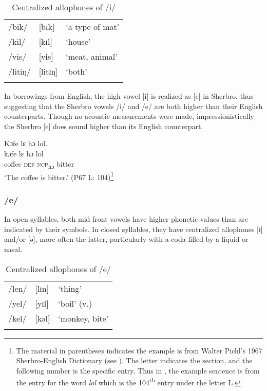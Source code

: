 \begin{table}
\caption{\label{tab:phon:6}Centralized allophones of /i/}

\begin{tabular}{lll}
\lsptoprule
/bik/ & [bɪk] & ‘a type of mat'\\
/kil/ & [kɪl] & ‘house'\\
/vis/ & [vɨs] & ‘meat, animal'\\
/litiŋ/ & [litɪŋ] & ‘both'\\
\lspbottomrule
\end{tabular}
\end{table}

In borrowings from English, the high vowel [i] is realized as [e] in Sherbro, thus suggesting that the Sherbro vowels /i/ and /e/ are both higher than their English counterparts. Though no acoustic measurements were made, impressionistically the Sherbro [e] does sound higher than its English counterpart.

\ea %
\label{ex:14}
Kɔfe lɛ hɔ lol.\\
\gll kɔfe    lɛ    hɔ    lol\\
coffee  \textsc{def}  \textsc{ncp}\textsubscript{hɔ}  bitter\\
\glt ‘The coffee is bitter.' (P67 L: 104)\footnote{The material in parentheses indicates the example is from Walter Pichl's 1967 Sherbro-English Dictionary (see ). The letter indicates the section, and the following number is the specific entry. Thus in , the example sentence is from the entry for the word \textit{lol} which is the 104\textsuperscript{th} entry under the letter L.}
\z

\subsubsection{/e/}
\label{sec:2.1.1.2}
In open syllables, both mid front vowels have higher phonetic values than are indicated by their symbols. In closed syllables, they have centralized allophones [ɪ] and/or [ə], more often the latter, particularly with a coda filled by a liquid or nasal.

\begin{table}
\caption{\label{tab:phon:7}Centralized allophones of /e/}


\begin{tabular}{lll} 
\lsptoprule
/len/ & [lɪn] & ‘thing'\\
/yel/ & [yɪl] & ‘boil' (v.)\\
/kel/ & [kəl] & ‘monkey, bite'\\
\lspbottomrule
\end{tabular}
\end{table}

